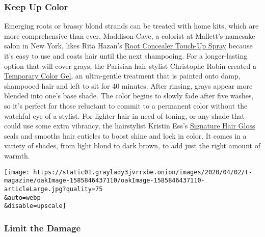 \hypertarget{keep-up-color}{%
\subsubsection{Keep Up Color}\label{keep-up-color}}

Emerging roots or brassy blond strands can be treated with home kits,
which are more comprehensive than ever. Maddison Cave, a colorist at
Mallett's namesake salon in New York, likes Rita Hazan's
\href{https://ritahazan.com/products/root-concealer-color-spray}{Root
Concealer Touch-Up Spray} because it's easy to use and coats hair until
the next shampooing. For a longer-lasting option that will cover grays,
the Parisian hair stylist Christophe Robin created a
\href{https://www.sephora.com/product/temporary-color-gel-P434541?om_mmc=ppc-GG_6557108356_78386220443_dsa-446571741513__385631213750_9067609_c\&country_switch=us\&lang=en\&gclid=EAIaIQobChMIqvOL4bix6AIVCoTICh1w0AdoEAAYAiAAEgKIxPD_BwE\&gclsrc=aw.ds\&skuId=2132397}{Temporary
Color Gel}, an ultra-gentle treatment that is painted onto damp,
shampooed hair and left to sit for 40 minutes. After rinsing, grays
appear more blended into one's base shade. The color begins to slowly
fade after five washes, so it's perfect for those reluctant to commit to
a permanent color without the watchful eye of a stylist. For lighter
hair in need of toning, or any shade that could use some extra vibrancy,
the hairstylist Kristin Ess's
\href{https://www.target.com/p/kristin-ess-signature-hair-gloss-golden-hour/-/A-75564253}{Signature
Hair Gloss} seals and smooths hair cuticles to boost shine and lock in
color. It comes in a variety of shades, from light blond to dark brown,
to add just the right amount of warmth.

\texttt{[image: https://static01.graylady3jvrrxbe.onion/images/2020/04/02/t-magazine/oakImage-1585846437110/oakImage-1585846437110-articleLarge.jpg?quality=75\\\&auto=webp\\\&disable=upscale]}

\hypertarget{limit-the-damage}{%
\subsubsection{Limit the Damage}\label{limit-the-damage}}

